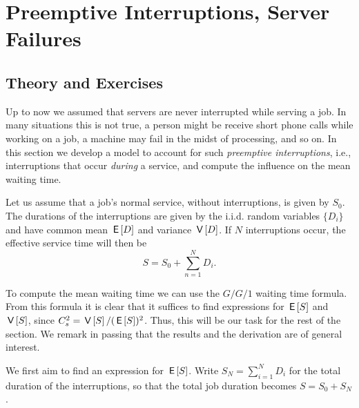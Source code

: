 \section{Preemptive Interruptions, Server Failures}
\label{sec:preempt-interr-serv}

\subsection*{Theory and Exercises}



Up to now we assumed that servers are never interrupted while serving a job. In many situations this is not true, a person  might be receive short phone calls while working on a job, a machine may fail in the midst of processing, and so on. In this section we develop a model to account for such \emph{preemptive interruptions}, i.e., interruptions that occur \emph{during} a service, and compute the influence on the mean waiting time. 

Let us assume that a job's normal service, without interruptions, is given by $S_0$. The durations of the interruptions are given by the i.i.d. random variables $\{D_i\}$ and have common mean $\,\mathsf{E}\left[D\right]$ and variance $\,\mathsf{V}\left[D\right]$. If $N$ interruptions occur, the effective service time will then be
\begin{equation*}
S= S_0 + \sum_{n=1}^N D_i.
\end{equation*}

To compute the mean waiting time we can use the $G/G/1$ waiting time formula. From this formula it is clear that it suffices to find expressions for $\,\mathsf{E}\left[S\right]$ and $\,\mathsf{V}\left[S\right]$, since $C_s^2 = \,\mathsf{V}\left[S\right] /(\,\mathsf{E}\left[S\right])^2$.  Thus, this will be our task for the rest of the section. We remark in passing that the results and the derivation are of general interest.

We first aim to find an expression for $\,\mathsf{E}\left[S\right]$.  Write  $S_N = \sum_{i=1}^N D_i$ for the total duration of the interruptions, so that the total job duration becomes $S = S_0 + S_N$.

